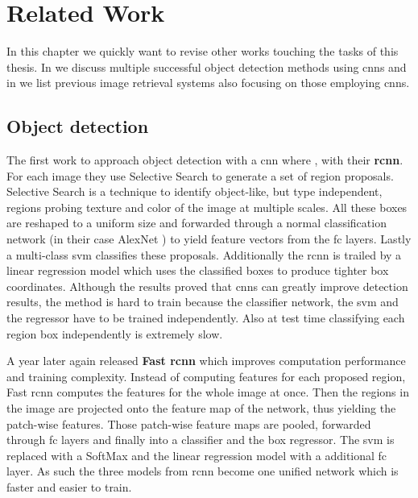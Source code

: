 %
\chapter{Related Work}
\label{sec:related}
In this chapter we quickly want to revise other works touching the tasks of this thesis. In  we discuss multiple successful object detection methods using \glspl{cnn} and in  we list previous image retrieval systems also focusing on those employing \glspl{cnn}.

\section{Object detection}
\label{sec:related:detection}
The first work to approach object detection with a \gls{cnn} where \citet{girshick_rich_2014}, with their \textbf{\gls{rcnn}}. For each image they use Selective Search to generate a set of region proposals. Selective Search is a technique to identify object-like, but type independent, regions probing texture and color of the image at multiple scales. All these boxes are reshaped to a uniform size and forwarded through a normal classification network (in their case AlexNet \citep{krizhevsky_imagenet_2012}) to yield feature vectors from the \gls{fc} layers. Lastly a multi-class \gls{svm} classifies these proposals. Additionally the \gls{rcnn} is trailed by a linear regression model which uses the classified boxes to produce tighter box coordinates. Although the results proved that \glspl{cnn} can greatly improve detection results, the method is hard to train because the classifier network, the \gls{svm} and the regressor have to be trained independently. Also at test time classifying each region box independently is extremely slow.

A year later again \citet{girshick_fast_2015} released \textbf{Fast \gls{rcnn}} which improves computation performance and training complexity. Instead of computing features for each proposed region, Fast \gls{rcnn} computes the features for the whole image at once. Then the regions in the image are projected onto the feature map of the network, thus yielding the patch-wise features. Those patch-wise feature maps are pooled, forwarded through \gls{fc} layers and finally into a classifier and the box regressor. The \gls{svm} is replaced with a SoftMax and the linear regression model with a additional \gls{fc} layer. As such the three models from \gls{rcnn} become one unified network which is faster and easier to train.

